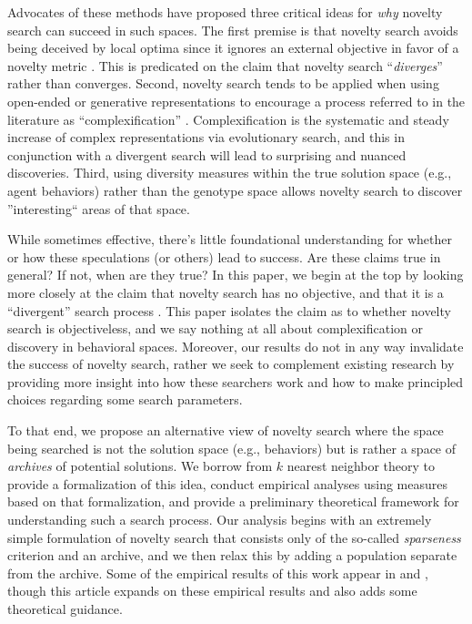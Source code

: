 \documentclass[twoside]{article}
\begin{document}
Advocates of these methods have proposed three critical ideas for \emph{why} novelty search can succeed in such spaces.  The first premise is that novelty search avoids being deceived by local optima since it ignores an external objective in favor of a novelty metric \citep{Lehman2011ecj}.  This is predicated on the claim that novelty search ``\emph{diverges}'' rather than converges.  Second, novelty search tends to be applied when using open-ended or generative representations \citep{LehmanStanley2008ssls} to encourage a process referred to in the literature as ``complexification'' \citep{StanleyMiikkulainen2004jair}.  Complexification is the systematic and steady increase of complex representations via evolutionary search, and this in conjunction with a divergent search will lead to surprising and nuanced discoveries.  Third, using diversity measures within the true solution space (e.g., agent behaviors) rather than the genotype space allows novelty search to discover ''interesting`` areas of that space.  

While sometimes effective, there's little foundational understanding for whether or how these speculations (or others) lead to success.  Are these claims true in general?  If not, when are they true?  In this paper, we begin at the top by looking more closely at the claim that novelty search has no objective, and that it is a ``divergent'' search process \citep{Lehman2016frai,Lehman2015gecco,StanleyLehman2015}.  This paper isolates the claim as to whether novelty search is objectiveless, and we say nothing at all about complexification or discovery in behavioral spaces.  Moreover, our results do not in any way invalidate the success of novelty search, rather we seek to complement existing research by providing more insight into how these searchers work and how to make principled choices regarding some search parameters.

To that end, we propose an alternative view of novelty search where the space being searched is not the solution space (e.g., behaviors) but is rather a space of \emph{archives} of potential solutions.  We borrow from $k$ nearest neighbor theory to provide a formalization of this idea, conduct empirical analyses using measures based on that formalization, and provide a preliminary theoretical framework for understanding such a search process.  Our analysis begins with an extremely simple formulation of novelty search that consists only of the so-called \emph{sparseness} criterion and an archive, and we then relax this by adding a population separate from the archive.  Some of the empirical results of this work appear in \citet{Wiegand2020flairs} and \citet{Wiegand2021flairs}, though this article expands on these empirical results and also adds some theoretical guidance.
\end{document}

